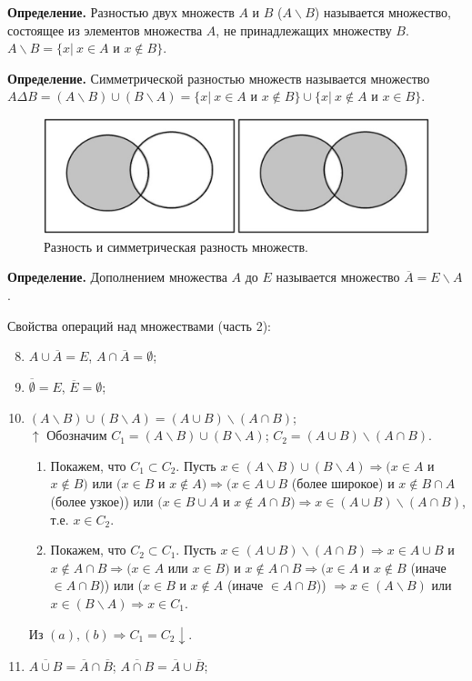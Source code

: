 \documentclass{article}
\begin{document}
    \textbf{Определение.} Разностью двух множеств $A$ и $B$ ($A \backslash B$) называется множество, состоящее из элементов множества $A$, не принадлежащих множеству $B$. $A \backslash B = \{x|\ x \in A \textrm{ и } x \not\in B\}$. 

    \textbf{Определение.} Симметрической разностью множеств называется множество $A \Delta B = (A \backslash B) \cup (B \backslash A) = \{x|\ x \in A \textrm{ и } x \not\in B\} \cup \{x|\ x \not\in A \textrm{ и } x \in B\}$. 

    \begin{figure}[h!]
    \centering
    \includegraphics{1_2}
    \caption{\label{fig:fig2}Разность и симметрическая разность множеств.}
    \end{figure}

    \textbf{Определение.} Дополнением множества $A$ до $E$ называется множество $\overline{A} = E \backslash A$.  

    Свойства операций над множествами (часть 2):
	\begin{enumerate}
        \setcounter{enumi}{7}
        \item $A \cup \overline{A} = E$, $A \cap \overline{A} = \emptyset$;
        \item $\overline{\emptyset} = E$, $\overline{E} = \emptyset$;
        \item $(A \backslash B) \cup (B \backslash A) = (A \cup B) \backslash (A \cap B)$;\\
        $\uparrow$ Обозначим $C_1 = (A \backslash B) \cup (B \backslash A)$; $C_2 = (A \cup B) \backslash (A \cap B)$.
        \begin{enumerate}
            \item Покажем, что $C_1 \subset C_2$. Пусть $x \in (A \backslash B) \cup (B \backslash A) \Rightarrow (x \in A$ и $x \not\in B)$ или $(x \in B$ и $x \not\in A) \Rightarrow (x \in A \cup B$ (более широкое) и $x \not\in B \cap A$ (более узкое)) или $(x \in B \cup A$ и $x \not\in A \cap B) \Rightarrow x \in (A \cup B) \backslash (A \cap B)$, т.е. $x \in C_2$.
            \item Покажем, что $C_2 \subset C_1$. Пусть $x \in (A \cup B) \backslash (A \cap B) \Rightarrow x \in A \cup B$ и $x \not\in A \cap B \Rightarrow (x \in A$ или $x \in B)$ и $x \not\in A \cap B \Rightarrow (x \in A$ и $x \not\in B$ (иначе $\in A \cap B$)) или ($x \in B$ и $x \not\in A$ (иначе $\in A \cap B$)) $\Rightarrow x \in (A \backslash B)$ или $x \in (B \backslash A) \Rightarrow x \in C_1$.
        \end{enumerate}
        Из $(a),(b) \Rightarrow C_1 = C_2 \downarrow.$ 
        \item $\overline{A \cup B} = \overline{A}\cap\overline{B}$; $\overline{A \cap B} = \overline{A}\cup\overline{B}$;
    \end{enumerate}
\end{document}
